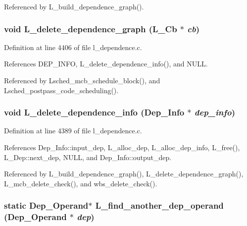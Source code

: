 Referenced by L\_\-build\_\-dependence\_\-graph().
\subsubsection{\setlength{\rightskip}{0pt plus 5cm}void L\_\-delete\_\-dependence\_\-graph (L\_\-Cb $\ast$ {\em cb})}\label{l__dependence_8c_d1437aabcc35bdaeb457e33113f3d2e5}




Definition at line 4406 of file l\_\-dependence.c.

References DEP\_\-INFO, L\_\-delete\_\-dependence\_\-info(), and NULL.

Referenced by Lsched\_\-mcb\_\-schedule\_\-block(), and Lsched\_\-postpass\_\-code\_\-scheduling().
\subsubsection{\setlength{\rightskip}{0pt plus 5cm}void L\_\-delete\_\-dependence\_\-info (\bf{Dep\_\-Info} $\ast$ {\em dep\_\-info})}\label{l__dependence_8c_5388c5ae76618fb82066c22de862641f}




Definition at line 4389 of file l\_\-dependence.c.

References Dep\_\-Info::input\_\-dep, L\_\-alloc\_\-dep, L\_\-alloc\_\-dep\_\-info, L\_\-free(), L\_\-Dep::next\_\-dep, NULL, and Dep\_\-Info::output\_\-dep.

Referenced by L\_\-build\_\-dependence\_\-graph(), L\_\-delete\_\-dependence\_\-graph(), L\_\-mcb\_\-delete\_\-check(), and wbs\_\-delete\_\-check().
\subsubsection{\setlength{\rightskip}{0pt plus 5cm}static \bf{Dep\_\-Operand}$\ast$ L\_\-find\_\-another\_\-dep\_\-operand (\bf{Dep\_\-Operand} $\ast$ {\em dep})\hspace{0.3cm}{\tt  [static]}}\label{l__dependence_8c_26eed6ee75763820634212e8a116b79e}




